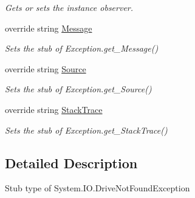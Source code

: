 \begin{DoxyCompactItemize}
\begin{DoxyCompactList}\small\item\em Gets or sets the instance observer.\end{DoxyCompactList}\item 
override string \hyperlink{class_system_1_1_i_o_1_1_fakes_1_1_stub_drive_not_found_exception_aa840e1cddcd8e8a48b80eabb1cfc9afb}{Message}
\begin{DoxyCompactList}\small\item\em Sets the stub of Exception.\-get\-\_\-\-Message()\end{DoxyCompactList}\item 
override string \hyperlink{class_system_1_1_i_o_1_1_fakes_1_1_stub_drive_not_found_exception_a8d134df9ed9d8f6f4f2a532fd50ee953}{Source}
\begin{DoxyCompactList}\small\item\em Sets the stub of Exception.\-get\-\_\-\-Source()\end{DoxyCompactList}\item 
override string \hyperlink{class_system_1_1_i_o_1_1_fakes_1_1_stub_drive_not_found_exception_a945c538209b77a2aa867f0ce8b03ee4f}{Stack\-Trace}
\begin{DoxyCompactList}\small\item\em Sets the stub of Exception.\-get\-\_\-\-Stack\-Trace()\end{DoxyCompactList}\end{DoxyCompactItemize}


\subsection{Detailed Description}
Stub type of System.\-I\-O.\-Drive\-Not\-Found\-Exception



